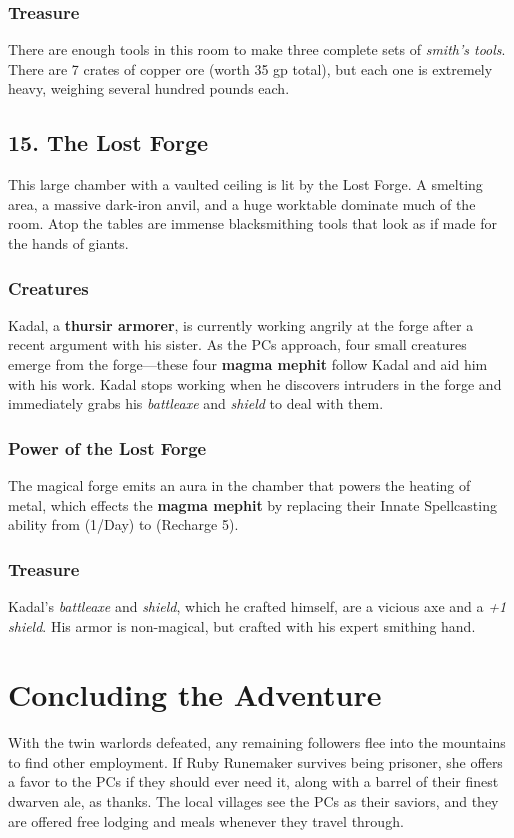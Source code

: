 \documentclass[10pt,a4paper,twoside,bg=print,twocolumn,openany,nodeprecatedcode]{dndbook}
\begin{document}
\subsubsection{Treasure}
There are enough tools in this room to make three complete sets of \textit{smith's tools}. There are 7 crates of copper ore (worth 35 gp total), but each one is extremely heavy, weighing several hundred pounds each.

\subsection{15. The Lost Forge}
\begin{DndReadAloud}{}
This large chamber with a vaulted ceiling is lit by the Lost Forge. A smelting area, a massive dark-iron anvil, and a huge worktable dominate much of the room. Atop the tables are immense blacksmithing tools that look as if made for the hands of giants.

\end{DndReadAloud}

\subsubsection{Creatures}
Kadal, a \textbf{thursir armorer}, is currently working angrily at the forge after a recent argument with his sister. As the PCs approach, four small creatures emerge from the forge—these four \textbf{magma mephit} follow Kadal and aid him with his work. Kadal stops working when he discovers intruders in the forge and immediately grabs his \textit{battleaxe} and \textit{shield} to deal with them.

\subsubsection{Power of the Lost Forge}
The magical forge emits an aura in the chamber that powers the heating of metal, which effects the \textbf{magma mephit} by replacing their Innate Spellcasting ability from (1/Day) to (Recharge 5).

\subsubsection{Treasure}
Kadal's \textit{battleaxe} and \textit{shield}, which he crafted himself, are a vicious axe and a \textit{+1 shield}. His armor is non-magical, but crafted with his expert smithing hand.

\section{Concluding the Adventure}
With the twin warlords defeated, any remaining followers flee into the mountains to find other employment. If Ruby Runemaker survives being prisoner, she offers a favor to the PCs if they should ever need it, along with a barrel of their finest dwarven ale, as thanks. The local villages see the PCs as their saviors, and they are offered free lodging and meals whenever they travel through.
\end{document}
